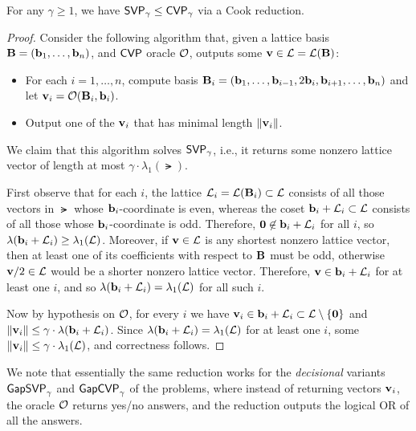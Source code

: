 \documentclass[11pt]{article}
\begin{document}
\begin{theorem}
  For any $\gamma \geq 1$, we have $\mathsf{SVP}_{\gamma} \leq \mathsf{CVP}_{\gamma}$
  via a Cook reduction.
\end{theorem}

\begin{proof}
  Consider the following algorithm that, given a lattice basis
  $\mathbf{B}=(\mathbf{b}_1, \ldots, \mathbf{b}_n)$, and $\mathsf{CVP}$ oracle $\mathcal{O}$,
  outputs some $\mathbf{v} \in \mathcal{L} = \mathcal{L}(\mathbf{B})$:
  \begin{itemize}[itemsep=0pt]
  \item For each $i=1,\ldots, n$, compute basis
    $\mathbf{B}_i = (\mathbf{b}_1, \ldots, \mathbf{b}_{i-1}, 2\mathbf{b}_i, \mathbf{b}_{i+1},
    \ldots, \mathbf{b}_n )$ and let $\mathbf{v}_i = \mathcal{O}(\mathbf{B}_i, \mathbf{b}_i)$.
  \item Output one of the $\mathbf{v}_i$ that has minimal length
    $\lVert\mathbf{v}_{i}\rVert$.
  \end{itemize}
  We claim that this algorithm solves $\mathsf{SVP}_{\gamma}$, i.e., it
  returns some nonzero lattice vector of length at most
  $\gamma \cdot \lambda_{1}(\lat)$.

  First observe that for each $i$, the lattice
  $\mathcal{L}_{i} = \mathcal{L}(\mathbf{B}_{i}) \subset \mathcal{L}$ consists of all those
  vectors in $\lat$ whose $\mathbf{b}_{i}$-coordinate is even, whereas the
  coset $\mathbf{b}_{i} + \mathcal{L}_{i} \subset \mathcal{L}$ consists of all those
  whose $\mathbf{b}_{i}$-coordinate is odd. Therefore,
  $\mathbf{0} \not\in \mathbf{b}_{i} + \mathcal{L}_{i}$ for all $i$, so
  $\lambda(\mathbf{b}_{i} + \mathcal{L}_{i}) \geq \lambda_{1}(\mathcal{L})$. Moreover, if
  $\mathbf{v} \in \mathcal{L}$ is any shortest nonzero lattice vector, then at
  least one of its coefficients with respect to $\mathbf{B}$ must be odd,
  otherwise $\mathbf{v}/2 \in \mathcal{L}$ would be a shorter nonzero lattice
  vector. Therefore, $\mathbf{v} \in \mathbf{b}_{i} + \mathcal{L}_{i}$ for at least one
  $i$, and so $\lambda(\mathbf{b}_{i}+\mathcal{L}_{i}) = \lambda_{1}(\mathcal{L})$ for
  all such $i$.

  Now by hypothesis on $\mathcal{O}$, for every $i$ we have
  $\mathbf{v}_{i} \in \mathbf{b}_{i} + \mathcal{L}_{i} \subset \mathcal{L} \setminus
  \{\mathbf{0}\}$ and
  $\lVert\mathbf{v}_{i}\rVert \leq \gamma \cdot \lambda(\mathbf{b}_{i} +
  \mathcal{L}_{i})$. Since
  $\lambda(\mathbf{b}_{i} + \mathcal{L}_{i}) = \lambda_{1}(\mathcal{L})$ for at least one
  $i$, some $\lVert\mathbf{v}_{i}\rVert \leq \gamma \cdot \lambda_{1}(\mathcal{L})$,
  and correctness follows.
\end{proof}

We note that essentially the same reduction works for the
\emph{decisional} variants $\mathsf{GapSVP}_{\gamma}$ and $\mathsf{GapCVP}_{\gamma}$
of the problems, where instead of returning vectors $\mathbf{v}_{i}$, the
oracle $\mathcal{O}$ returns yes/no answers, and the reduction outputs the
logical OR of all the answers.
\end{document}
